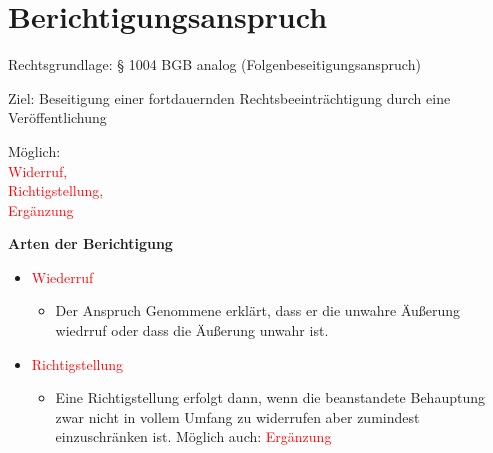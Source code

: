 \section{Berichtigungsanspruch}
\begin{arrowlist}
    \item Rechtsgrundlage: § 1004 BGB analog (Folgenbeseitigungsanspruch)
    \item Ziel: Beseitigung einer fortdauernden Rechtsbeeinträchtigung durch eine Veröffentlichung
    \item Möglich:\\
    \textcolor{red}{Widerruf,\\ Richtigstellung,\\ Ergänzung}
\end{arrowlist}
\textbf{Arten der Berichtigung}
\begin{itemize}
    \item \textcolor{red}{Wiederruf}
    \begin{itemize}
        \item Der Anspruch Genommene erklärt, dass er die unwahre Äußerung \glqq{}wiedrruf\grqq{} oder dass die Äußerung \glqq{}unwahr\grqq{} ist. 
    \end{itemize}
    \item \textcolor{red}{Richtigstellung}
    \begin{itemize}
        \item Eine Richtigstellung erfolgt dann, wenn die beanstandete Behauptung zwar nicht in vollem Umfang zu widerrufen aber zumindest einzuschränken ist. Möglich auch: \textcolor{red}{Ergänzung}
    \end{itemize}
\end{itemize}
%
%
%
